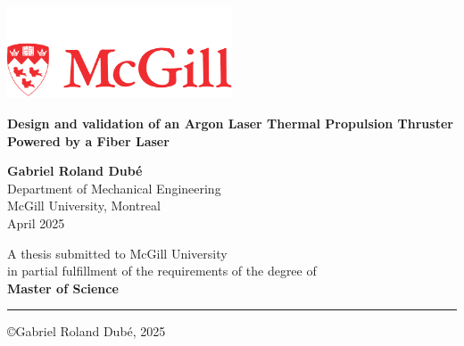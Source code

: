 \begin{titlepage}
  \thispagestyle{empty}
  \sffamily
  \begin{center}
    \includegraphics[width=0.5\textwidth]{assets/McGill_logo.pdf} \\
    \vspace*{2cm}
    
    \huge
    \textbf{Design and validation of an Argon Laser Thermal Propulsion Thruster Powered by a Fiber Laser}
    
    \large

    
    \vspace{1.5cm}    
    \textbf{Gabriel Roland Dubé}\\

    
    \vspace{0.5cm}
    Department of Mechanical Engineering\\
    McGill University, Montreal\\

    \vspace{1.5cm}
    April 2025\\
    \vspace{1.5cm}
    
    A thesis submitted to McGill University \\
    in partial fulfillment of the requirements of the degree of\\
    \textbf{Master of Science}\\
    
    \vfill

    {\color{red}\hrule}

    \copyright Gabriel Roland Dubé, 2025
            
  \end{center}
\end{titlepage}
